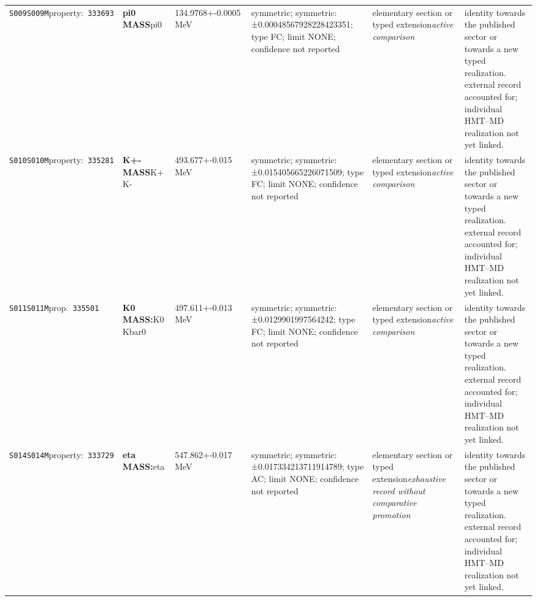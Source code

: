 \begin{landscape}
\begin{longtable}{L{1.85cm}L{4.45cm}L{2.35cm}L{4.05cm}L{3.35cm}L{7.15cm}}
\texttt{S009}\newline \texttt{S009M}\newline property:\ \texttt{333693} & \textbf{pi0 MASS}\newline pi0 & 134.9768+-0.0005\,MeV & symmetric; symmetric: ±0.00048567928228423351; type FC; limit NONE; confidence not reported & elementary section or typed extension\newline \emph{active comparison} & identity towards the published sector or towards a new typed realization. external record accounted for; individual HMT--MD realization not yet linked. \\
\texttt{S010}\newline \texttt{S010M}\newline property:\ \texttt{335281} & \textbf{K+- MASS}\newline K+ \textbar{}\allowbreak{} K- & 493.677+-0.015\,MeV & symmetric; symmetric: ±0.015405665226071509; type FC; limit NONE; confidence not reported & elementary section or typed extension\newline \emph{active comparison} & identity towards the published sector or towards a new typed realization. external record accounted for; individual HMT--MD realization not yet linked. \\
\texttt{S011}\newline \texttt{S011M}\newline prop.\ \texttt{335501} & \textbf{K0 MASS:}\newline K0 \textbar{}\allowbreak{} Kbar0 & 497.611+-0.013\,MeV & symmetric; symmetric: ±0.0129901997564242; type FC; limit NONE; confidence not reported & elementary section or typed extension\newline \emph{active comparison} & identity towards the published sector or towards a new typed realization. external record accounted for; individual HMT--MD realization not yet linked. \\
\texttt{S014}\newline \texttt{S014M}\newline property:\ \texttt{333729} & \textbf{eta MASS:}\newline eta & 547.862+-0.017\,MeV & symmetric; symmetric: ±0.017334213711914789; type AC; limit NONE; confidence not reported & elementary section or typed extension\newline \emph{exhaustive record without comparative promotion} & identity towards the published sector or towards a new typed realization. external record accounted for; individual HMT--MD realization not yet linked. \\

\end{longtable}
\end{landscape}
